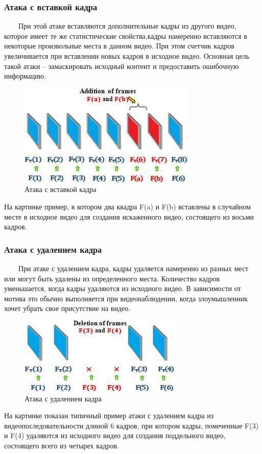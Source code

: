 \documentclass[12pt]{article}
\begin{document}
    \subsubsection{Атака с вставкой кадра}
        $\qquad$При этой атаке вставляются дополнительные кадры из другого видео, которое имеет те же статистические свойства,кадры намеренно вставляются в некоторые произвольные места в данном видео. При этом счетчик кадров увеличивается при вставлении новых кадров в исходное видео. Основная цель такой атаки – замаскировать исходный контент и предоставить ошибочную информацию. 
        \newline
        \begin{figure}[h!]
            \centering
            \includegraphics[width = 220 pt] {9.jpg}
            \caption{Атака с вставкой кадра}
        \end{figure}
        \newline
        На картинке пример, в котором два квадра F(a) и F(b) вставлены в случайном месте в исходное видео для создания искаженного видео, состоящего из восьми кадров.
    \subsubsection{Атака с удалением кадра}
        $\qquad$При атаке с удалением кадра, кадры удаляется намеренно из разных мест или могут быть удалены из определенного места. Количество кадров уменьшается, когда кадры удаляются из исходного видео. В зависимости от мотива это обычно выполняется при видеонаблюдении, когда злоумышленник хочет убрать свое присутствие на видео. 
        \newline
        \begin{figure}[h!]
            \centering
            \includegraphics[width = 210 pt] {10.jpg}
            \caption{Атака с удалением кадра}
        \end{figure}
        \newline
        На картинке показан типичный пример атаки с удалением кадра из видеопоследовательности длиной 6 кадров, при котором кадры, помеченные F(3) и F(4) удаляются из исходного видео для создания поддельного видео, состоящего всего из четырех кадров.
\end{document}
